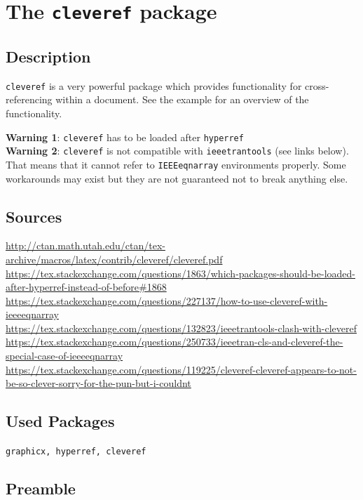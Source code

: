 \documentclass{article}
\begin{document}
\section*{The \texttt{cleveref} package}

\subsection*{Description}
\verb|cleveref| is a very powerful package which provides functionality for cross-referencing within a document. See the example for an overview of the functionality.

\textbf{Warning 1}: \verb|cleveref| has to be loaded after \verb|hyperref|\\
\textbf{Warning 2}: \verb|cleveref| is not compatible with \verb|ieeetrantools| (see links below). That means that it cannot refer to \texttt{IEEEeqnarray} environments properly. Some workarounds may exist but they are not guaranteed not to break anything else.

\subsection*{Sources}
\url{http://ctan.math.utah.edu/ctan/tex-archive/macros/latex/contrib/cleveref/cleveref.pdf}\\
\url{https://tex.stackexchange.com/questions/1863/which-packages-should-be-loaded-after-hyperref-instead-of-before#1868}\\
\url{https://tex.stackexchange.com/questions/227137/how-to-use-cleveref-with-ieeeeqnarray}\\
\url{https://tex.stackexchange.com/questions/132823/ieeetrantools-clash-with-cleveref}\\
\url{https://tex.stackexchange.com/questions/250733/ieeetran-cls-and-cleveref-the-special-case-of-ieeeeqnarray}
\url{https://tex.stackexchange.com/questions/119225/cleveref-cleveref-appears-to-not-be-so-clever-sorry-for-the-pun-but-i-couldnt}

\subsection*{Used Packages}
\verb|graphicx, hyperref, cleveref|

\subsection*{Preamble}
\begin{latex}
\usepackage{hyperref}
\usepackage{graphicx}
\usepackage[noabbrev]{cleveref}

\end{latex}
\end{document}
